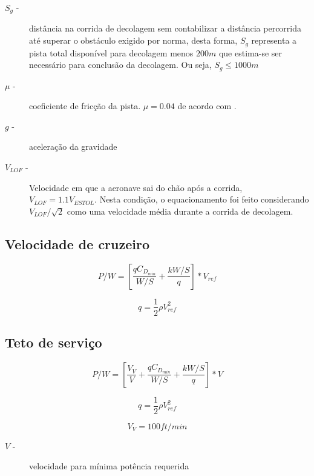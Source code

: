 \begin{description}
 \item[$S_g$  -]distância na corrida de decolagem sem contabilizar a distância percorrida até superar o obstáculo exigido por norma, desta forma, $S_g$ representa a pista total disponível para decolagem menos $200 m$ que estima-se ser necessário para conclusão da decolagem. Ou seja, $S_g \leq 1000m$
 \item[$\mu$ -]coeficiente de fricção da pista. $\mu = 0.04$ de acordo com \cite{gudmundsson}.
 \item[$g$  -]aceleração da gravidade
 \item[$V_{LOF}$  -]Velocidade em que a aeronave sai do chão após a corrida, $V_{LOF} = 1.1 V_{ESTOL}$. Nesta condição, o equacionamento foi feito considerando $V_{LOF}/\sqrt{2}$ como uma velocidade média durante a corrida de decolagem.
\end{description}

\subsection{Velocidade de cruzeiro}

\begin{equation}
P/W = \left[ \frac{q C_{D_{min}}}{W/S} + \frac{k W/S}{q} \right] * V_{ref}
\end{equation}

\begin{equation}
q = \frac{1}{2} \rho V_{ref}^2
\end{equation}

\subsection{Teto de serviço}
\begin{equation}
P/W = \left[ \frac{V_V}{V} + \frac{q C_{D_{min}}}{W/S} +  \frac{k W/S}{q} \right] * V 
\end{equation}

\begin{equation}
q = \frac{1}{2} \rho V_{ref}^2
\end{equation}

\begin{equation}
V_V = 100 ft/min 
\end{equation}

\begin{description}
 \item[$V$  -]velocidade para mínima potência requerida 
\end{description}

